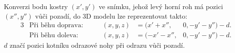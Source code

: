 Konverzi bodu kostry $(x',y')$ ve snímku, jehož levý horní roh má pozici $(x'',y'')$ vůči pozadí, do 3D modelu lze reprezentovat takto:
\begin{alignat*}{3}
&\text{Při běhu doprava:} &\qquad (x,y,z)&=(x'+x'',&0,-y'-y'')-d. \\
&\text{Při běhu doleva:} &\qquad (x,y,z)&=(-x'-x'',&0,-y'-y'')-d.
\end{alignat*}
$d$ značí pozici kotníku odrazové nohy při odrazu vůči pozadí.











